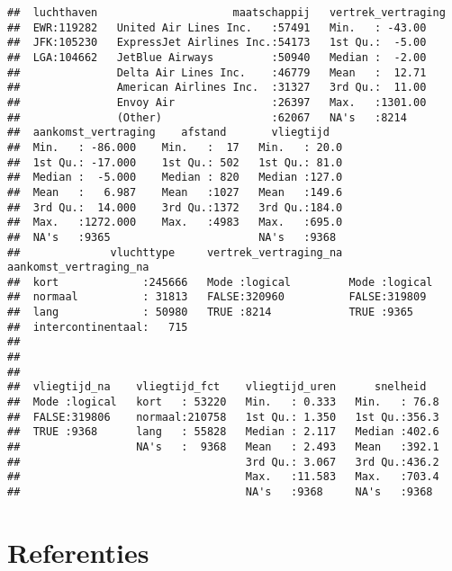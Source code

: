 \documentclass[]{memoir}
\begin{document}
\begin{verbatim}
##  luchthaven                     maatschappij   vertrek_vertraging
##  EWR:119282   United Air Lines Inc.   :57491   Min.   : -43.00   
##  JFK:105230   ExpressJet Airlines Inc.:54173   1st Qu.:  -5.00   
##  LGA:104662   JetBlue Airways         :50940   Median :  -2.00   
##               Delta Air Lines Inc.    :46779   Mean   :  12.71   
##               American Airlines Inc.  :31327   3rd Qu.:  11.00   
##               Envoy Air               :26397   Max.   :1301.00   
##               (Other)                 :62067   NA's   :8214      
##  aankomst_vertraging    afstand       vliegtijd    
##  Min.   : -86.000    Min.   :  17   Min.   : 20.0  
##  1st Qu.: -17.000    1st Qu.: 502   1st Qu.: 81.0  
##  Median :  -5.000    Median : 820   Median :127.0  
##  Mean   :   6.987    Mean   :1027   Mean   :149.6  
##  3rd Qu.:  14.000    3rd Qu.:1372   3rd Qu.:184.0  
##  Max.   :1272.000    Max.   :4983   Max.   :695.0  
##  NA's   :9365                       NA's   :9368   
##              vluchttype     vertrek_vertraging_na aankomst_vertraging_na
##  kort             :245666   Mode :logical         Mode :logical         
##  normaal          : 31813   FALSE:320960          FALSE:319809          
##  lang             : 50980   TRUE :8214            TRUE :9365            
##  intercontinentaal:   715                                               
##                                                                         
##                                                                         
##                                                                         
##  vliegtijd_na    vliegtijd_fct    vliegtijd_uren      snelheid    
##  Mode :logical   kort   : 53220   Min.   : 0.333   Min.   : 76.8  
##  FALSE:319806    normaal:210758   1st Qu.: 1.350   1st Qu.:356.3  
##  TRUE :9368      lang   : 55828   Median : 2.117   Median :402.6  
##                  NA's   :  9368   Mean   : 2.493   Mean   :392.1  
##                                   3rd Qu.: 3.067   3rd Qu.:436.2  
##                                   Max.   :11.583   Max.   :703.4  
##                                   NA's   :9368     NA's   :9368
\end{verbatim}

\hypertarget{referenties-3}{%
\section*{Referenties}\label{referenties-3}}
\end{document}
